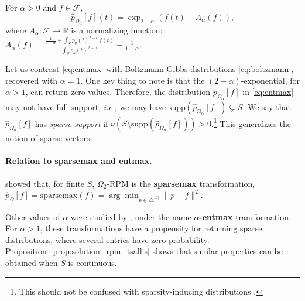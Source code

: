 \documentclass{article}
\newcommand{\remove}[1]{}
\begin{document}
\vspace{0.15cm}
\begin{proposition}\label{prop:solution_rpm_tsallis}
For $\alpha > 0$ and $f\in\mathcal{F}$, 
\begin{equation}\label{eq:entmax}
\hat{p}_{\Omega_\alpha}[f](t) = \exp_{2-\alpha}(f(t) - A_\alpha(f)), \end{equation}
where 
$A_\alpha: \mathcal{F} \rightarrow \mathbb{R}$ is a normalizing function:
$A_\alpha(f) = \frac{\frac{1}{1-\alpha} + \int_S p_\theta(t)^{2-\alpha} f(t)}{\int_S p_\theta(t)^{2-\alpha}} - \frac{1}{1-\alpha}.$
\end{proposition}

Let us contrast \eqref{eq:entmax} with Boltzmann-Gibbs distributions \eqref{eq:boltzmann}, recovered with $\alpha=1$. One key thing to note is that the $(2-\alpha)$-exponential, for $\alpha > 1$, can return zero values. Therefore, the distribution $\hat{p}_{\Omega_\alpha}[f]$ in \eqref{eq:entmax} may not have full support, \textit{i.e.}, we may have $\mathrm{supp}(\hat{p}_{\Omega_\alpha}[f]) \subsetneq S$.  
We say that $\hat{p}_{\Omega_\alpha}[f]$ has {\it sparse support} if $\nu(S \setminus \mathrm{supp}(\hat{p}_{\Omega_\alpha}[f])) > 0$.\footnote{This should not be confused with sparsity-inducing distributions \citep{FigueiredoNIPS2001,TippingJMLR2001}.} This generalizes the notion of sparse vectors.
 

\paragraph{Relation to sparsemax and entmax.} 
\citet{blondel2020learning}  showed that, for finite $S$,  $\Omega_2$-RPM is the {\bf sparsemax} transformation, $\hat{p}_\Omega[f] = \mathrm{sparsemax}(f) =
\arg\min_{p \in \triangle^{|S|}} \|p - f\|^2$. 
\remove{(Euclidean projection of  $f\in\mathbb{R}^{|S|}$ onto the $|S|$-dimensional probability simplex $\triangle^{|S|}$).} 
Other values of $\alpha$ were studied by \citet{peters2019sparse}, under the name {\bf $\alpha$-entmax} transformation. For $\alpha>1$, these transformations have a propensity for returning sparse distributions, where several entries have zero probability. 
Proposition~\ref{prop:solution_rpm_tsallis} shows that similar properties can be obtained when $S$ is continuous. 
\end{document}
